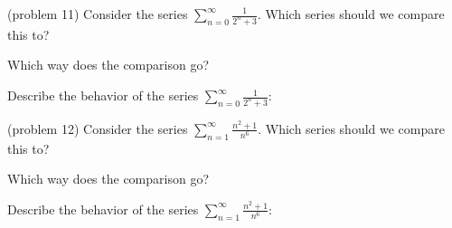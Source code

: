 \documentclass{ximera}
\begin{document}
\begin{problem}(problem 11)
Consider the series $\displaystyle{\sum_{n=0}^\infty \frac{1}{2^n + 3}}$.
Which series should we compare this to?

\begin{multipleChoice}
\end{multipleChoice}

Which way does the comparison go?
\begin{multipleChoice}
\end{multipleChoice}

Describe the behavior of the series $\sum_{n=0}^\infty \frac{1}{2^n + 3}:$
\begin{multipleChoice}
\end{multipleChoice}

\end{problem}





\begin{problem}(problem 12)
Consider the series $\displaystyle{\sum_{n=1}^\infty \frac{n^2 +1}{n^6}}$.
Which series should we compare this to?

\begin{multipleChoice}
\end{multipleChoice}

Which way does the comparison go?
\begin{multipleChoice}
\end{multipleChoice}

Describe the behavior of the series $\sum_{n=1}^\infty \frac{n^2+1}{n^6}:$
\begin{multipleChoice}
\end{multipleChoice}

\end{problem}
\end{document}
